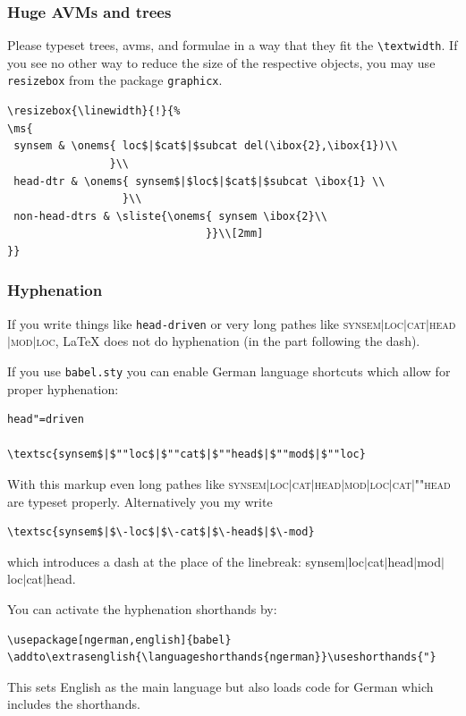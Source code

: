 \documentclass[11pt,a4paper,fleqn]{article}
\begin{document}
\subsubsection{Huge AVMs and trees}
\label{huge}

Please typeset trees, avms, and formulae in a way that they fit the
\verb+\textwidth+. If you see no other way to reduce the size of the respective
objects, you may use \verb+resizebox+ from the package \verb+graphicx+.
{\small
\begin{verbatim}
\resizebox{\linewidth}{!}{%
\ms{
 synsem & \onems{ loc$|$cat$|$subcat del(\ibox{2},\ibox{1})\\
                }\\
 head-dtr & \onems{ synsem$|$loc$|$cat$|$subcat \ibox{1} \\
                  }\\
 non-head-dtrs & \sliste{\onems{ synsem \ibox{2}\\ 
                               }}\\[2mm]
}}
\end{verbatim}
}


\subsubsection{Hyphenation}
\label{hyphenation}

If you write things like \verb+head-driven+ or very long pathes like
\textsc{synsem$|$loc$|$cat$|$head$|$mod$|$loc}, \LaTeX{} does not do hyphenation
(in the part following the dash).

If you use \verb+babel.sty+ you can enable German language shortcuts which allow for proper hyphenation:
\begin{verbatim}
head"=driven

\textsc{synsem$|$""loc$|$""cat$|$""head$|$""mod$|$""loc}
\end{verbatim}
With this markup even long pathes like \textsc{synsem$|$loc$|$cat$|$head$|$mod$|$loc$|$cat$|$""head}
are typeset properly. Alternatively you my write
\begin{verbatim}
\textsc{synsem$|$\-loc$|$\-cat$|$\-head$|$\-mod}
\end{verbatim}
which introduces a dash at the place of the linebreak:
{\sc synsem$|$\-loc$|$\-cat$|$\-head$|$\-mod$|$\-loc$|$\-cat$|$\-head}.

You can activate the hyphenation shorthands by:
\begin{verbatim}
\usepackage[ngerman,english]{babel}
\addto\extrasenglish{\languageshorthands{ngerman}}\useshorthands{"}
\end{verbatim}
This sets English as the main language but also loads code for German which includes the shorthands.
\end{document}
